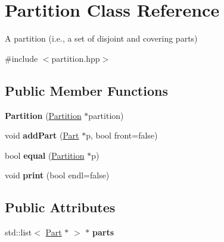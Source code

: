 \hypertarget{class_partition}{}\section{Partition Class Reference}
\label{class_partition}


A partition (i.\+e., a set of disjoint and covering parts)  




{\ttfamily \#include $<$partition.\+hpp$>$}

\subsection*{Public Member Functions}
\begin{DoxyCompactItemize}
\item 
\hypertarget{class_partition_acb291b3b0ccf48005e141be32fdd7efd}{}{\bfseries Partition} (\hyperlink{class_partition}{Partition} $\ast$partition)\label{class_partition_acb291b3b0ccf48005e141be32fdd7efd}

\item 
\hypertarget{class_partition_a63f82a3a75dc0c3d0d27766b2459c9fe}{}void {\bfseries add\+Part} (\hyperlink{class_part}{Part} $\ast$p, bool front=false)\label{class_partition_a63f82a3a75dc0c3d0d27766b2459c9fe}

\item 
\hypertarget{class_partition_abced08b339e293866a614b2f21414375}{}bool {\bfseries equal} (\hyperlink{class_partition}{Partition} $\ast$p)\label{class_partition_abced08b339e293866a614b2f21414375}

\item 
\hypertarget{class_partition_a3463b34ab90d020ed40635c473301a64}{}void {\bfseries print} (bool endl=false)\label{class_partition_a3463b34ab90d020ed40635c473301a64}

\end{DoxyCompactItemize}
\subsection*{Public Attributes}
\begin{DoxyCompactItemize}
\item 
\hypertarget{class_partition_a887cae6498c54754779d7956b48e8d3e}{}std\+::list$<$ \hyperlink{class_part}{Part} $\ast$ $>$ $\ast$ {\bfseries parts}\label{class_partition_a887cae6498c54754779d7956b48e8d3e}

\end{DoxyCompactItemize}



